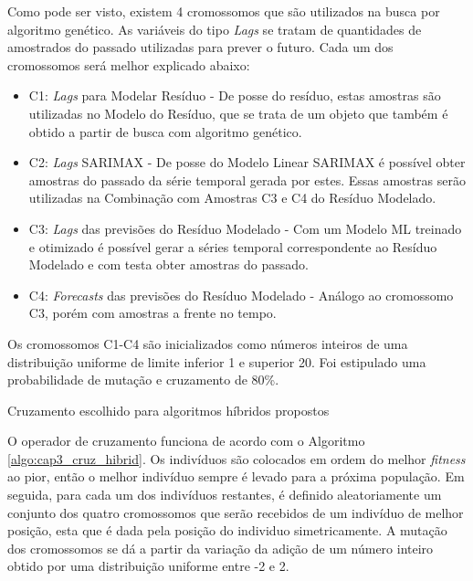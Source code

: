 Como pode ser visto, existem 4 cromossomos que são utilizados na busca por algoritmo genético. As variáveis do tipo \textit{Lags} se tratam de quantidades de amostrados do passado utilizadas para prever o futuro. Cada um dos cromossomos será melhor explicado abaixo:

\begin{itemize}
    \item C1: \textit{Lags} para Modelar Resíduo - De posse do resíduo, estas amostras são utilizadas no Modelo do Resíduo, que se trata de um objeto que também é obtido a partir de busca com algoritmo genético.
    
    \item C2: \textit{Lags} SARIMAX - De posse do Modelo Linear SARIMAX é possível obter amostras do passado da série temporal gerada por estes. Essas amostras serão utilizadas na Combinação com Amostras C3 e C4 do Resíduo Modelado.
    
    \item C3: \textit{Lags} das previsões do Resíduo Modelado - Com um Modelo ML treinado e otimizado é possível gerar a séries temporal correspondente ao Resíduo Modelado e com testa obter amostras do passado.
    
    \item C4: \textit{Forecasts} das previsões do Resíduo Modelado - Análogo ao cromossomo C3, porém com amostras a frente no tempo.
\end{itemize}

Os cromossomos C1-C4 são inicializados como números inteiros de uma distribuição uniforme de limite inferior 1 e superior 20. Foi estipulado uma probabilidade de mutação e cruzamento de 80\%.

\begin{algorithm}[!hbp]
    \caption{Cruzamento escolhido para algoritmos híbridos propostos}
    \label{algo:cap3_cruz_hibrid}
\end{algorithm}

O operador de cruzamento funciona de acordo com o Algoritmo \ref{algo:cap3_cruz_hibrid}. Os indivíduos são colocados em ordem do melhor \textit{fitness} ao pior, então o melhor indivíduo sempre é levado para a próxima população. Em seguida, para cada um dos indivíduos restantes, é definido aleatoriamente um conjunto dos quatro cromossomos que serão recebidos de um indivíduo de melhor posição, esta que é dada pela posição do individuo simetricamente. A mutação dos cromossomos se dá a partir da variação da adição de um número inteiro obtido por uma distribuição uniforme entre -2 e 2.

